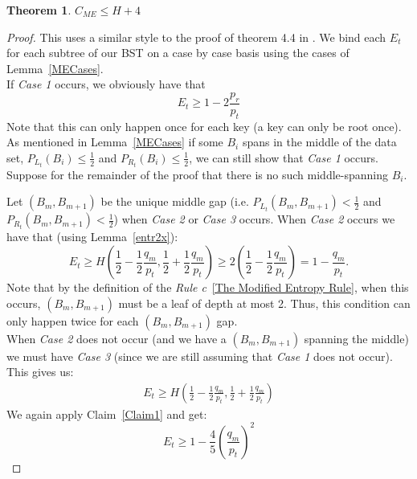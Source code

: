 \documentclass[letterpaper,12pt,titlepage,oneside,final]{book}
\theoremstyle{plain}
\newtheorem{thm}{Theorem}[section]
\begin{document}
\begin{thm}
$C_{ME} \leq H + 4$
\end{thm}

\begin{proof}
This uses a similar style to the proof of theorem 4.4 in \cite{bayer1975improved}.
We bind each $E_t$ for each subtree of our BST on a case by case basis using the cases of Lemma~\ref{MECases}.\\
If \textit{Case 1} occurs, we obviously have that
\begin{equation}\label{EQC1}
E_t \geq 1-2 \frac{p_r}{p_t}
\end{equation}
Note that this can only happen once for each key (a key can only be root once). \\

As mentioned in Lemma~\ref{MECases} if some $B_i$ spans in the middle of the data set, $P_{L_t}(B_i) \leq \frac{1}{2}$ and $P_{R_t}(B_i) \leq \frac{1}{2}$, we can still show that \textit{Case 1} occurs. Suppose for the remainder of the proof that there is no such middle-spanning $B_i$.

Let $(B_m, B_{m+1})$ be the unique middle gap (i.e. $P_{L_t}(B_m, B_{m+1}) < \frac{1}{2}$ and $P_{R_t}(B_m, B_{m+1}) < \frac{1}{2}$) when \textit{Case 2} or \textit{Case 3} occurs. When \textit{Case 2} occurs we have that (using Lemma~\ref{entr2x}):
\begin{equation}\label{EQC2} 
E_t \geq H(\frac{1}{2}-\frac{1}{2} \frac{q_m}{p_t}, \frac{1}{2} + \frac{1}{2} \frac{q_m}{p_t}) \geq 2(\frac{1}{2}-\frac{1}{2} \frac{q_m}{p_t})=1-\frac{q_m}{p_t}.
\end{equation}
Note that by the definition of the \textit{Rule c}~\ref{The Modified Entropy Rule}, when this occurs, $(B_m, B_{m+1})$ must be a leaf of depth at most 2. Thus, this condition can only happen twice for each $(B_m, B_{m+1})$ gap. \\

When \textit{Case 2} does not occur (and we have a $(B_m, B_{m+1})$ spanning the middle) we must have \textit{Case 3} (since we are still assuming that \textit{Case 1} does not occur). This gives us:
\begin{align*}
E_t \geq H(\frac{1}{2}-\frac{1}{2} \frac{q_m}{p_t}, \frac{1}{2} + \frac{1}{2} \frac{q_m}{p_t})
\end{align*}
We again apply Claim~\ref{Claim1} and get:
\begin{equation}\label{EQC3}
E_t \geq 1- \frac{4}{5} (\frac{q_m}{p_t})^2
\end{equation}


\end{proof}
\end{document}
